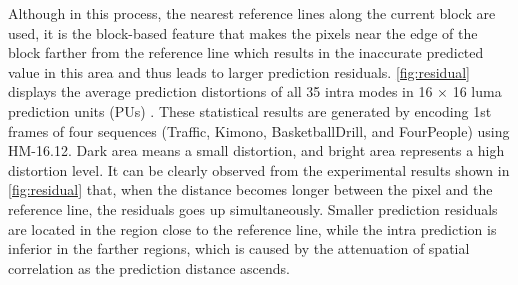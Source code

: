 \documentclass[journal]{IEEEtran}
\begin{document}
Although in this process, the nearest reference lines along the current block are used, it is the block-based feature that makes the pixels near the edge of the block farther from the reference line which results in the inaccurate predicted value in this area and thus leads to larger prediction residuals. \autoref{fig:residual} displays the average prediction distortions of all 35 intra modes in 16 × 16 luma prediction units (PUs) \cite{08}. These statistical results are generated by encoding 1st frames of four sequences (Traffic, Kimono, BasketballDrill, and FourPeople) using HM-16.12. Dark area means a small distortion, and bright area represents a high distortion level. It can be clearly observed from the experimental results shown in \autoref{fig:residual} that, when the distance becomes longer between the pixel and the reference line, the residuals goes up simultaneously. Smaller prediction residuals are located in the region close to the reference line, while the intra prediction is inferior in the farther regions, which is caused by the attenuation of spatial correlation as the prediction distance ascends.
\end{document}
